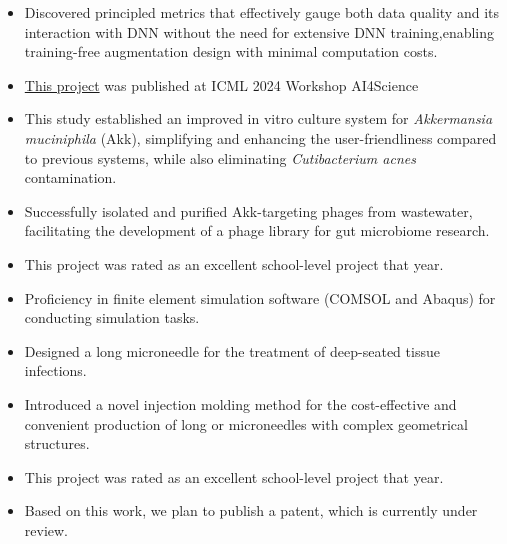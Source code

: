 \documentclass{resume}
\begin{document}
    \begin{itemize}
      \item Discovered principled metrics that effectively gauge both data quality and its interaction with DNN without the need for extensive DNN training,enabling training-free augmentation design with minimal computation costs.
      \item \href{https://openreview.net/forum?id=kmAdBRaShI}{This project} was published at ICML 2024 Workshop AI4Science
    \end{itemize}
    
  \begin{itemize}
    \item This study established an improved in vitro culture system for \textit{Akkermansia muciniphila} (Akk), simplifying and enhancing the user-friendliness compared to previous systems, while also eliminating \textit{Cutibacterium acnes} contamination.
    \item Successfully isolated and purified Akk-targeting phages from wastewater, facilitating the development of a phage library for gut microbiome research.
    \item This project was rated as an excellent school-level project that year.
  \end{itemize}


    \begin{itemize}
      \item Proficiency in finite element simulation software (COMSOL and Abaqus) for conducting simulation tasks.
      \item Designed a long microneedle for the treatment of deep-seated tissue infections.
      \item Introduced a novel injection molding method for the cost-effective and convenient production of long or microneedles with complex geometrical structures.
      \item This project was rated as an excellent school-level project that year.
      \item Based on this work, we plan to publish a patent, which is currently under review.
    \end{itemize}
\end{document}
